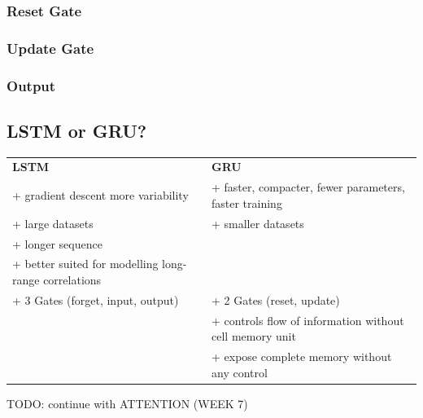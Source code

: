 \documentclass[a4paper, landscape, 10pt]{scrartcl}
\begin{document}
\begin{multicols*}{3}
        \subsubsection{Reset Gate}
        \subsubsection{Update Gate}

        \subsubsection{Output}

        \subsection{LSTM or GRU?}

        \begin{tabularx}{\columnwidth}{X | X}
            \textbf{LSTM} & \textbf{GRU} \\
            + gradient descent more variability & + faster, compacter, fewer parameters, faster training \\
            \hline
            + large datasets & + smaller datasets \\
            \hline
            + longer sequence & \\
            + better suited for modelling long-range correlations & \\
            \hline
            + 3 Gates (forget, input, output) & + 2 Gates (reset, update) \\
            \hline
            & + controls flow of information without cell memory unit \\
            \hline
            & + expose complete memory without any control
        \end{tabularx}

        TODO: continue with ATTENTION (WEEK 7)

    \end{multicols*}
\end{document}
